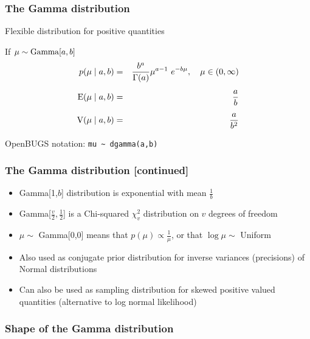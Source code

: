 \begin{frame}[containsverbatim]
\frametitle{The Gamma distribution}

Flexible distribution for positive quantities \vspace{2mm}

If $\mu \sim {\rm Gamma}[a,b]$
  \begin{eqnarray*}
p(\mu \mid a, b) & = & \frac{ b^a }{\Gamma(a) } \mu^{a-1} \ e^{-b\mu}, \hspace{10pt} \mu \in (0,\infty)   \\[5pt]
{\rm E}(\mu  \mid a, b) &= &   \frac{a}{ b }     \\[5pt]
{\rm V}(\mu  \mid a, b) &= &   \frac{a}{ b^2 }
\end{eqnarray*}

OpenBUGS notation:  \verb"mu ~ dgamma(a,b)"
\end{frame}

\begin{frame}[containsverbatim]
\frametitle{The Gamma distribution [continued]}
\begin{itemize}
\item  Gamma[1,$b$] distribution is exponential with mean $\frac{1}{b}$\vspace{2mm}
\item  Gamma[$\frac{v}{2},\frac{1}{2}$] is a Chi-squared $\chi^2_v$ distribution on $v$ degrees of freedom\vspace{2mm}
\item $\mu \sim $ Gamma[0,0] means that $p(\mu) \propto \frac{1}{\mu}$, or that $\log \mu \sim$ Uniform\vspace{2mm}
\item Also used as conjugate prior distribution for inverse variances (precisions) of Normal distributions\vspace{2mm}
\item Can also be used as sampling distribution for skewed positive valued quantities (alternative to log normal likelihood)
\end{itemize}
\end{frame}

\begin{frame}
    \frametitle{Shape of the Gamma distribution}
\end{frame}


